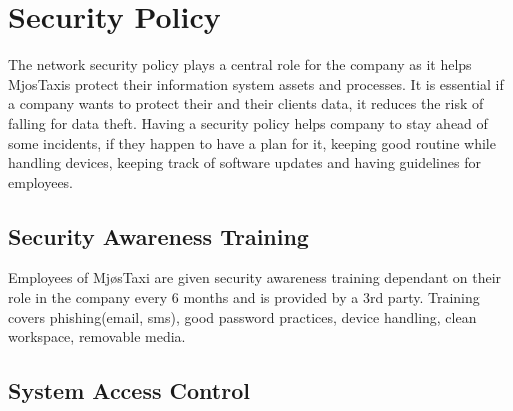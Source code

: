 \chapter{Security Policy}
\label{chap:securityPolicy}



The network security policy plays a central role for the company as it helps MjosTaxis protect their information system assets and processes.
It is essential if a company wants to protect their and their clients data, it reduces the risk of falling for data theft.
Having a security policy helps company to stay ahead of some incidents, if they happen to have a plan for it, keeping good routine while handling devices, keeping track of software updates and having guidelines for employees.

\section{Security Awareness Training}
Employees of MjøsTaxi are given security awareness training dependant on their role in the company every 6 months and is provided by a 3rd party.
Training covers phishing(email, sms), good password practices, device handling, clean workspace, removable media.

\section{System Access Control}
